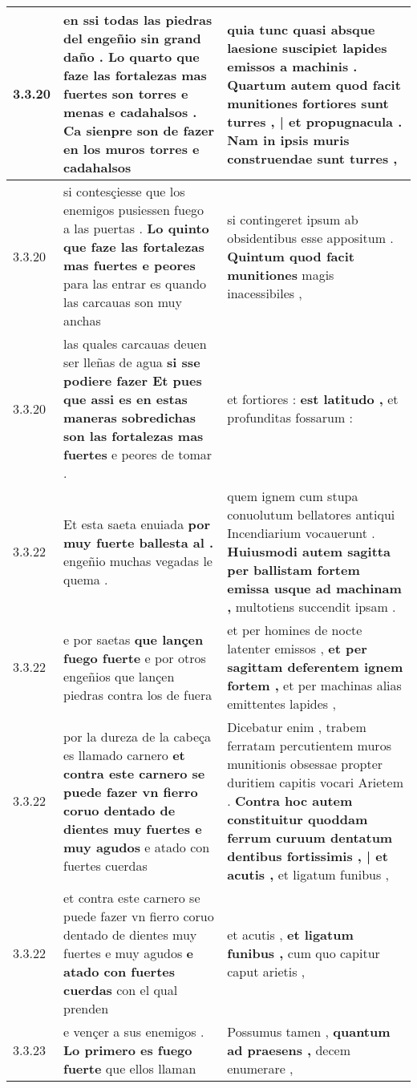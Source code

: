 \begin{tabular}{|p{1cm}|p{6.5cm}|p{6.5cm}|}
3.3.20 & en ssi todas las piedras del engeñio sin grand daño . \textbf{ Lo quarto que faze las fortalezas mas fuertes son torres e menas e cadahalsos . } Ca sienpre son de fazer en los muros torres e cadahalsos & quia tunc quasi absque laesione suscipiet lapides emissos a machinis . \textbf{ Quartum autem quod facit munitiones fortiores sunt turres , | et propugnacula . } Nam in ipsis muris construendae sunt turres , \\\hline
3.3.20 & si contesçiesse que los enemigos pusiessen fuego a las puertas . \textbf{ Lo quinto que faze las fortalezas mas fuertes e peores } para las entrar es quando las carcauas son muy anchas & si contingeret ipsum ab obsidentibus esse appositum . \textbf{ Quintum quod facit munitiones } magis inacessibiles , \\\hline
3.3.20 & las quales carcauas deuen ser lleñas de agua \textbf{ si sse podiere fazer Et pues que assi es en estas maneras sobredichas son las fortalezas mas fuertes } e peores de tomar . & et fortiores : \textbf{ est latitudo , } et profunditas fossarum : \\\hline
3.3.22 & Et esta saeta enuiada \textbf{ por muy fuerte ballesta al . } engeñio muchas vegadas le quema . & quem ignem cum stupa conuolutum bellatores antiqui Incendiarium vocauerunt . \textbf{ Huiusmodi autem sagitta per ballistam fortem emissa usque ad machinam , } multotiens succendit ipsam . \\\hline
3.3.22 & e por saetas \textbf{ que lançen fuego fuerte } e por otros engeñios que lançen piedras contra los de fuera & et per homines de nocte latenter emissos , \textbf{ et per sagittam deferentem ignem fortem , } et per machinas alias emittentes lapides , \\\hline
3.3.22 & por la dureza de la cabeça es llamado carnero \textbf{ et contra este carnero se puede fazer vn fierro coruo dentado de dientes muy fuertes e muy agudos } e atado con fuertes cuerdas & Dicebatur enim , trabem ferratam percutientem muros munitionis obsessae propter duritiem capitis vocari Arietem . \textbf{ Contra hoc autem constituitur quoddam ferrum curuum dentatum dentibus fortissimis , | et acutis , } et ligatum funibus , \\\hline
3.3.22 & et contra este carnero se puede fazer vn fierro coruo dentado de dientes muy fuertes e muy agudos \textbf{ e atado con fuertes cuerdas } con el qual prenden & et acutis , \textbf{ et ligatum funibus , } cum quo capitur caput arietis , \\\hline
3.3.23 & e vençer a sus enemigos . \textbf{ Lo primero es fuego fuerte } que ellos llaman & Possumus tamen , \textbf{ quantum ad praesens , } decem enumerare , \\\hline

\end{tabular}
